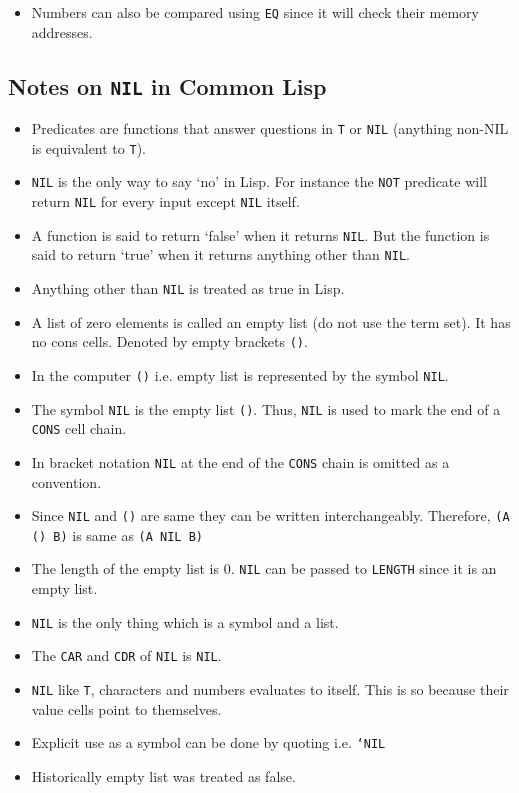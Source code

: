 \documentclass[11pt]{article}
\begin{document}
\begin{itemize}
\begin{verbatim}
\end{verbatim}
\item Numbers can also be compared using \texttt{EQ} since it will check their memory addresses.
\end{itemize}

\subsection{Notes on \texttt{NIL} in Common Lisp}
\label{sec:orgca51909}
\vspace{1em}

\begin{itemize}
\item Predicates are functions that answer questions in \texttt{T} or \texttt{NIL} (anything non-NIL is equivalent to \texttt{T}).
\item \texttt{NIL} is the only way to say ‘no’ in Lisp. For instance the \texttt{NOT} predicate will return \texttt{NIL} for every input
except \texttt{NIL} itself.
\item A function is said to return ‘false’ when it returns \texttt{NIL}. But the function is said to return ‘true’ when it
returns anything other than \texttt{NIL}.
\item Anything other than \texttt{NIL} is treated as true in Lisp.
\item A list of zero elements is called an empty list (do not use the term set). It has no cons cells. Denoted by empty
brackets \texttt{()}.
\item In the computer \texttt{()} i.e. empty list is represented by the symbol \texttt{NIL}.
\item The symbol \texttt{NIL} is the empty list \texttt{()}. Thus, \texttt{NIL} is used to mark the end of a \texttt{CONS} cell chain.
\item In bracket notation \texttt{NIL} at the end of the \texttt{CONS} chain is omitted as a convention.
\item Since \texttt{NIL} and \texttt{()} are same they can be written interchangeably. Therefore, \texttt{(A () B)} is same as \texttt{(A NIL B)}
\item The length of the empty list is 0. \texttt{NIL} can be passed to \texttt{LENGTH} since it is an empty list.
\item \texttt{NIL} is the only thing which is a symbol and a list.
\item The \texttt{CAR} and \texttt{CDR} of \texttt{NIL} is \texttt{NIL}.
\item \texttt{NIL} like \texttt{T}, characters and numbers evaluates to itself. This is so because their value cells point to
themselves.
\item Explicit use as a symbol can be done by quoting i.e. \texttt{‘NIL}
\item Historically empty list was treated as false.
\end{itemize}
\end{document}
